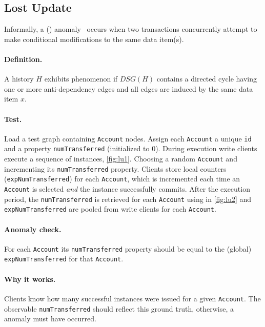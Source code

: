 \subsection{Lost Update}
\label{sec:lost-update}

Informally, a  () 
anomaly~\cite{DBLP:journals/tods/BailisFGHS16} occurs when two transactions 
concurrently attempt to make conditional modifications to the same data item(s).

\paragraph{Definition.}
A history $H$ exhibits phenomenon  if $\textit{DSG}(H)$ contains a 
directed cycle having one or more anti-dependency edges and all edges are induced
by the same data item $x$.

\paragraph{Test.}
Load a test graph containing \texttt{Account} nodes. Assign each \texttt{Account} 
a unique \texttt{id} and a property \texttt{numTransferred} (initialized to 0).
During execution write clients execute a sequence of  
instances, \autoref{fig:lu1}. Choosing a random \texttt{Account} and incrementing 
its \texttt{numTransferred} property. Clients store local counters 
(\texttt{expNumTransferred}) for each \texttt{Account}, which is incremented 
each time an \texttt{Account} is selected \emph{and} the  
instance successfully commits. After the execution period, the 
\texttt{numTransferred} is retrieved for each \texttt{Account} using 
 in \autoref{fig:lu2} and \texttt{expNumTransferred} are 
pooled from write clients for each \texttt{Account}.

\paragraph{Anomaly check.}
For each \texttt{Account} its \texttt{numTransferred} property should be equal 
to the (global) \texttt{expNumTransferred} for that \texttt{Account}.

\paragraph{Why it works.}
Clients know how many successful  instances were issued 
for a given \texttt{Account}. The observable \texttt{numTransferred} should 
reflect this ground truth, otherwise, a  anomaly must have occurred.

